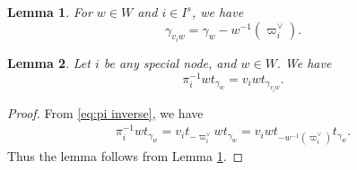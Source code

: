 \documentclass[10pt,a4paper]{amsart}
\newtheorem{lem}{Lemma}
\newcommand{\miw}[1]{v_{#1}}
\newcommand{\piv}{\varpi^\lor}
\begin{document}
\begin{lem}\label{lem:key key} For $w\in W$ and $i\in I^s$, we have
\begin{equation}
\gamma_{\miw{i} w}=\gamma_w-w^{-1}(\piv_i).\label{eq:key}
\end{equation}
\end{lem}

\begin{lem}
\label{lem:key}
Let $i$ be any special node, and $w\in W.$ We have
\begin{equation*}
\pi_i^{-1}wt_{\gamma_w}=
\miw{i} wt_{\gamma_{\miw{i} w}}.
\end{equation*}
\end{lem}

\begin{proof}From \eqref{eq:pi inverse}, we have
\begin{align*}
\pi_i^{-1}w
t_{\gamma_w}=
\miw{i} t_{-\piv_i}w
t_{\gamma_w}
=\miw{i}
wt_{-w^{-1}(\piv_i)}t_{\gamma_w}.
\end{align*}
Thus the lemma follows from Lemma \ref{lem:key key}.
\end{proof}
\end{document}
